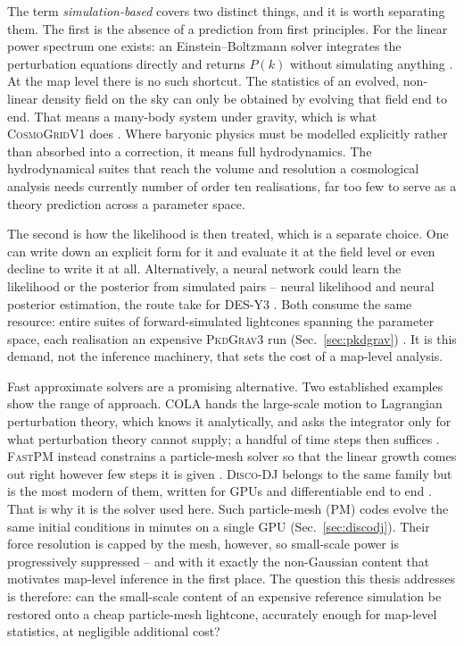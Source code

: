 \documentclass{report}
\begin{document}
The term \emph{simulation-based} covers two distinct things, and it is worth separating them. The first is the absence of a prediction from first principles. For the linear power spectrum one exists: an Einstein--Boltzmann solver integrates the perturbation equations directly and returns \mbox{$P(k)$} without simulating anything \cite{seljak_line_1996}. At the map level there is no such shortcut. The statistics of an evolved, non-linear density field on the sky can only be obtained by evolving that field end to end. That means a many-body system under gravity, which is what \textsc{CosmoGridV1} does \cite{kacprzak_cosmogridv1_2023, potter_pkdgrav3_2016}. Where baryonic physics must be modelled explicitly rather than absorbed into a correction, it means full hydrodynamics. The hydrodynamical suites that reach the volume and resolution a cosmological analysis needs currently number of order ten realisations, far too few to serve as a theory prediction across a parameter space.

The second is how the likelihood is then treated, which is a separate choice. One can write down an explicit form for it and evaluate it at the field level or even decline to write it at all. Alternatively, a neural network could learn the likelihood or the posterior from simulated pairs -- neural likelihood and neural posterior estimation, the route \citeauthor{jeffrey_dark_2024} take for DES-Y3 \cite{jeffrey_dark_2024}. Both consume the same resource: entire suites of forward-simulated lightcones spanning the parameter space, each realisation an expensive \textsc{PkdGrav3} run (Sec.~\ref{sec:pkdgrav}) \cite{potter_pkdgrav3_2016}. It is this demand, not the inference machinery, that sets the cost of a map-level analysis.

Fast approximate solvers are a promising alternative. Two established examples show the range of approach. \textsc{COLA} hands the large-scale motion to Lagrangian perturbation theory, which knows it analytically, and asks the integrator only for what perturbation theory cannot supply; a handful of time steps then suffices \cite{tassev_solving_2013}. \textsc{FastPM} instead constrains a particle-mesh solver so that the linear growth comes out right however few steps it is given \cite{feng_fastpm_2016}. \textsc{Disco-DJ} belongs to the same family but is the most modern of them, written for GPUs and differentiable end to end \cite{hahn_disco-dj_2024, list_disco-dj_2026}. That is why it is the solver used here. Such particle-mesh (PM) codes evolve the same initial conditions in minutes on a single GPU (Sec.~\ref{sec:discodj}). Their force resolution is capped by the mesh, however, so small-scale power is progressively suppressed \cite{schneider_matter_2015} -- and with it exactly the non-Gaussian content that motivates map-level inference in the first place. The question this thesis addresses is therefore: can the small-scale content of an expensive reference simulation be restored onto a cheap particle-mesh lightcone, accurately enough for map-level statistics, at negligible additional cost?
\end{document}
